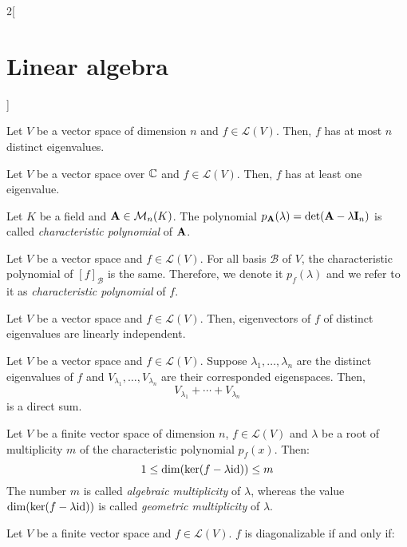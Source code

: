 \documentclass[../../../main.tex]{subfiles}
\begin{document}
\begin{multicols}{2}[\section{Linear algebra}]
\begin{lemma}
  \end{lemma}
  \begin{corollary}
    Let $V$ be a vector space of dimension $n$ and $f\in\mathcal{L}(V)$. Then, $f$ has at most $n$ distinct eigenvalues.
  \end{corollary}
  \begin{corollary}
    Let $V$ be a vector space over $\mathbb{C}$ and $f\in\mathcal{L}(V)$. Then, $f$ has at least one eigenvalue.
  \end{corollary}
  \begin{definition}
    Let $K$ be a field and $\boldsymbol{\mathrm{A}}\in\mathcal{M}_n(K)$. The polynomial $p_{\boldsymbol{\mathrm{A}}}(\lambda)=\det(\boldsymbol{\mathrm{A}}-\lambda \boldsymbol{\mathrm{I}}_n)$ is called \emph{characteristic polynomial} of $\boldsymbol{\mathrm{A}}$.
  \end{definition}
  \begin{prop}
    Let $V$ be a vector space and $f\in\mathcal{L}(V)$. For all basis $\mathcal{B}$ of $V$, the characteristic polynomial of $[f]_\mathcal{B}$ is the same. Therefore, we denote it $p_f(\lambda)$ and we refer to it as \emph{characteristic polynomial} of $f$.
  \end{prop}
  \begin{prop}
    Let $V$ be a vector space and $f\in\mathcal{L}(V)$. Then, eigenvectors of $f$ of distinct eigenvalues are linearly independent.
  \end{prop}
  \begin{corollary}
    Let $V$ be a vector space and $f\in\mathcal{L}(V)$. Suppose $\lambda_1,\ldots,\lambda_n$ are the distinct eigenvalues of $f$ and $V_{\lambda_1},\ldots,V_{\lambda_n}$ are their corresponded eigenspaces. Then, $$V_{\lambda_1}+\cdots+V_{\lambda_n}$$ is a direct sum.
  \end{corollary}
  \begin{prop}
    Let $V$ be a finite vector space of dimension $n$, $f\in\mathcal{L}(V)$ and $\lambda$ be a root of multiplicity $m$ of the characteristic polynomial $p_f(x)$. Then: $$1\leq \dim(\ker(f-\lambda\mathrm{id}))\leq m$$
    The number $m$ is called \emph{algebraic multiplicity} of $\lambda$, whereas the value $\dim(\ker(f-\lambda\mathrm{id}))$ is called \emph{geometric multiplicity} of $\lambda$.
  \end{prop}
  \begin{theorem}
    Let $V$ be a finite vector space and $f\in\mathcal{L}(V)$. $f$ is diagonalizable if and only if:
    \begin{enumerate}

\end{enumerate}
\end{theorem}
\end{multicols}
\end{document}
